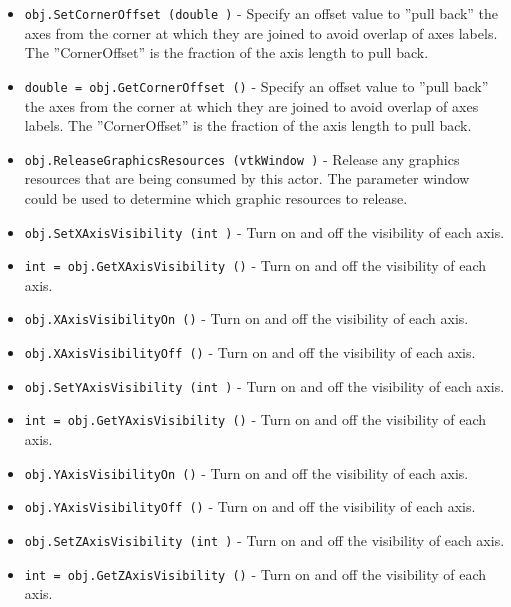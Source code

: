 \begin{itemize}
\item  \verb|obj.SetCornerOffset (double )| -  Specify an offset value to ''pull back'' the axes from the corner at
 which they are joined to avoid overlap of axes labels. The 
 ''CornerOffset'' is the fraction of the axis length to pull back.

\item  \verb|double = obj.GetCornerOffset ()| -  Specify an offset value to ''pull back'' the axes from the corner at
 which they are joined to avoid overlap of axes labels. The 
 ''CornerOffset'' is the fraction of the axis length to pull back.

\item  \verb|obj.ReleaseGraphicsResources (vtkWindow )| -  Release any graphics resources that are being consumed by this actor.
 The parameter window could be used to determine which graphic
 resources to release.

\item  \verb|obj.SetXAxisVisibility (int )| -  Turn on and off the visibility of each axis.

\item  \verb|int = obj.GetXAxisVisibility ()| -  Turn on and off the visibility of each axis.

\item  \verb|obj.XAxisVisibilityOn ()| -  Turn on and off the visibility of each axis.

\item  \verb|obj.XAxisVisibilityOff ()| -  Turn on and off the visibility of each axis.

\item  \verb|obj.SetYAxisVisibility (int )| -  Turn on and off the visibility of each axis.

\item  \verb|int = obj.GetYAxisVisibility ()| -  Turn on and off the visibility of each axis.

\item  \verb|obj.YAxisVisibilityOn ()| -  Turn on and off the visibility of each axis.

\item  \verb|obj.YAxisVisibilityOff ()| -  Turn on and off the visibility of each axis.

\item  \verb|obj.SetZAxisVisibility (int )| -  Turn on and off the visibility of each axis.

\item  \verb|int = obj.GetZAxisVisibility ()| -  Turn on and off the visibility of each axis.


\end{itemize}
